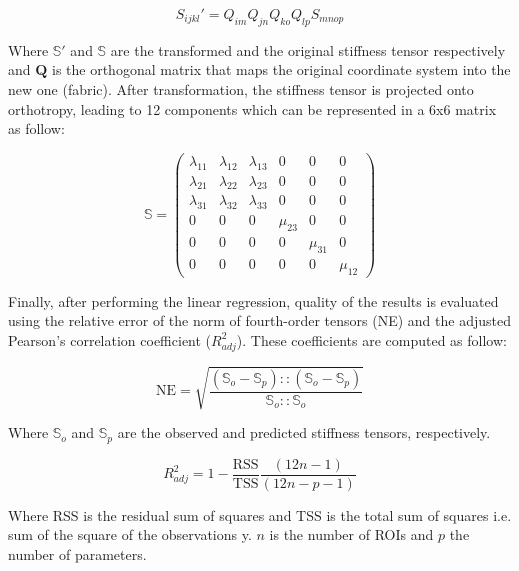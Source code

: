 \documentclass[a4paper,fleqn]{DC_ArtStyle}
\begin{document}
	\begin{equation}
	S_{ijkl}' = Q_{im}Q_{jn}Q_{ko}Q_{lp} S_{mnop}
	\label{Eq203p}
	\end{equation}
	
	Where $\mathbb{S}'$ and $\mathbb{S}$ are the transformed and the original stiffness tensor respectively and $\mathbf{Q}$ is the orthogonal matrix that maps the original coordinate system into the new one (fabric). After transformation, the stiffness tensor is projected onto orthotropy, leading to 12 components which can be represented in a 6x6 matrix as follow:
	
	\begin{equation}
	\mathbb{S} = 
	\begin{pmatrix}
		\lambda_{11} & \lambda_{12} & \lambda_{13} & 0 & 0 & 0 \\
		\lambda_{21} & \lambda_{22} & \lambda_{23} & 0 & 0 & 0 \\
		\lambda_{31} & \lambda_{32} & \lambda_{33} & 0 & 0 & 0 \\
		0 & 0 & 0 & \mu_{23} & 0 & 0 \\
		0 & 0 & 0 & 0 & \mu_{31} & 0 \\
		0 & 0 & 0 & 0 & 0 & \mu_{12}
	\end{pmatrix}
	\label{Eq203x}
	\end{equation}
	
	Finally, after performing the linear regression, quality of the results is evaluated using the relative error of the norm of fourth-order tensors (NE) and the adjusted Pearson's correlation coefficient ($R^2_{adj}$). These coefficients are computed as follow:
	
	\begin{equation}
	\text{NE} = \sqrt{\frac{(\mathbb{S}_o - \mathbb{S}_p) :: (\mathbb{S}_o - \mathbb{S}_p)}{\mathbb{S}_o :: \mathbb{S}_o}}
	\label{Eq206}
	\end{equation}
	
	Where $\mathbb{S}_o$ and $\mathbb{S}_p$ are the observed and predicted stiffness tensors, respectively.
		
	\begin{equation}
	R^2_{adj} = 1 - \frac{\mathrm{RSS}}{\mathrm{TSS}} \frac{(12n-1)}{(12n - p - 1)}
	\label{Eq205}
	\end{equation}
	
	Where RSS is the residual sum of squares and TSS is the total sum of squares i.e. sum of the square of the observations y. $n$ is the number of ROIs and $p$ the number of parameters.
	
\end{document}
